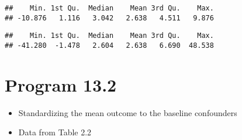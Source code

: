 \documentclass[10pt,]{book}
\newenvironment{Shaded}{\begin{snugshade}}{\end{snugshade}}
\newcommand{\DecValTok}[1]{\textcolor[rgb]{0.00,0.00,0.81}{#1}}
\newcommand{\KeywordTok}[1]{\textcolor[rgb]{0.13,0.29,0.53}{\textbf{#1}}}
\newcommand{\NormalTok}[1]{#1}
\newcommand{\OperatorTok}[1]{\textcolor[rgb]{0.81,0.36,0.00}{\textbf{#1}}}
\newcommand{\StringTok}[1]{\textcolor[rgb]{0.31,0.60,0.02}{#1}}
\providecommand{\tightlist}{%
  \setlength{\itemsep}{0pt}\setlength{\parskip}{0pt}}
\begin{document}
\begin{verbatim}
##    Min. 1st Qu.  Median    Mean 3rd Qu.    Max. 
## -10.876   1.116   3.042   2.638   4.511   9.876
\end{verbatim}

\begin{Shaded}
\end{Shaded}

\begin{verbatim}
##    Min. 1st Qu.  Median    Mean 3rd Qu.    Max. 
## -41.280  -1.478   2.604   2.638   6.690  48.538
\end{verbatim}

\hypertarget{program-13.2}{%
\section{Program 13.2}\label{program-13.2}}

\begin{itemize}
\tightlist
\item
  Standardizing the mean outcome to the baseline confounders
\item
  Data from Table 2.2
\end{itemize}
\end{document}
